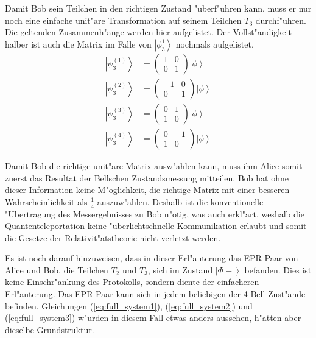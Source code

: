 \begin{refsection}
Damit Bob sein Teilchen in den richtigen Zustand "uberf"uhren kann, muss er nur noch eine einfache unit"are Transformation auf seinem Teilchen $T_{3}$ durchf"uhren. Die geltenden Zusammenh"ange werden hier aufgelistet. Der Vollst"andigkeit halber ist auch die Matrix im Falle von $\left|\phi_{3}^{1}\right\rangle$ nochmals aufgelistet.
\begin{align}
	\left| \psi_{3}^{(1)} \right \rangle & = \begin{pmatrix} 1 & 0 \\ 0 & 1 \end{pmatrix} \left| \phi \right \rangle \\
	\left| \psi_{3}^{(2)} \right \rangle & = \begin{pmatrix} -1 & 0 \\ 0 & 1 \end{pmatrix} \left| \phi \right \rangle \\
	\left| \psi_{3}^{(3)} \right \rangle & = \begin{pmatrix} 0 & 1 \\ 1 & 0 \end{pmatrix} \left| \phi \right \rangle \\
	\left| \psi_{3}^{(4)} \right \rangle & = \begin{pmatrix} 0 & -1 \\ 1 & 0 \end{pmatrix} \left| \phi \right \rangle
\end{align}

Damit Bob die richtige unit"are Matrix ausw"ahlen kann, muss ihm Alice somit zuerst das Resultat der Bellschen Zustandsmessung mitteilen. Bob hat ohne dieser Information keine M"oglichkeit, die richtige Matrix mit einer besseren Wahrscheinlichkeit als $\frac{1}{4}$ auszuw"ahlen. Deshalb ist die konventionelle "Ubertragung des Messergebnisses zu Bob n"otig, was auch erkl"art, weshalb die  Quantenteleportation keine "uberlichtschnelle Kommunikation erlaubt und somit die Gesetze der Relativit"atstheorie nicht verletzt werden.

Es ist noch darauf hinzuweisen, dass in dieser Erl"auterung das EPR Paar von Alice und Bob, die Teilchen $T_{2}$ und $T_{3}$, sich im Zustand $\left| \Phi{-} \right\rangle$ befanden. Dies ist keine Einschr"ankung des Protokolls, sondern diente der einfacheren Erl"auterung. Das EPR Paar kann sich in jedem beliebigen der 4 Bell Zust"ande befinden. Gleichungen (\ref{eq:full_system1}), (\ref{eq:full_system2}) und (\ref{eq:full_system3}) w"urden in diesem Fall etwas anders aussehen, h"atten aber dieselbe Grundstruktur.


\end{refsection}
